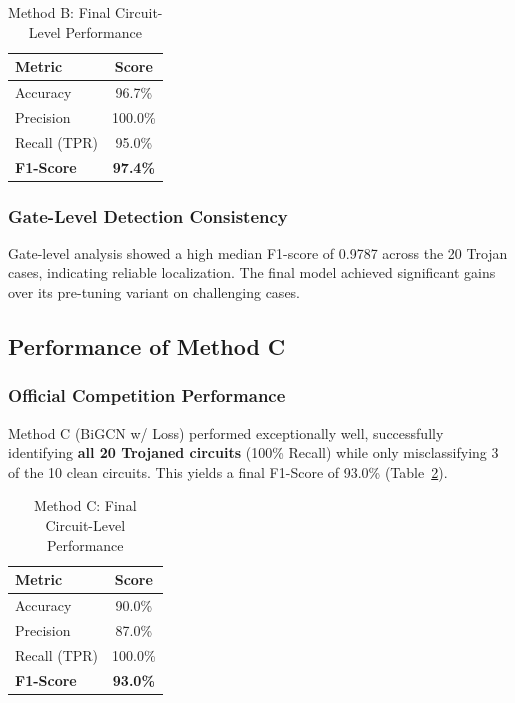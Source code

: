 \documentclass[conference]{IEEEtran}
\begin{document}
\begin{table}[h!]
    \centering
    \caption{Method B: Final Circuit-Level Performance}
    \label{tab:competition_results_B}
    \begin{tabular}{lc}
        \toprule
        \textbf{Metric} & \textbf{Score} \\ \midrule
        Accuracy      & 96.7\% \\
        Precision     & 100.0\% \\
        Recall (TPR)  & 95.0\% \\
        \textbf{F1-Score}      & \textbf{97.4\%} \\ \bottomrule
    \end{tabular}
\end{table}
\subsubsection{Gate-Level Detection Consistency}
Gate-level analysis showed a high median F1-score of 0.9787 across the 20 Trojan cases, indicating reliable localization. The final model achieved significant gains over its pre-tuning variant on challenging cases.

\subsection{Performance of Method C}
\subsubsection{Official Competition Performance}
Method C (BiGCN w/ Loss) performed exceptionally well, successfully identifying \textbf{all 20 Trojaned circuits} (100\% Recall) while only misclassifying 3 of the 10 clean circuits. This yields a final F1-Score of 93.0\% (Table~\ref{tab:competition_results_C}).

\begin{table}[h!]
    \centering
    \caption{Method C: Final Circuit-Level Performance}
    \label{tab:competition_results_C}
    \begin{tabular}{lc}
        \toprule
        \textbf{Metric} & \textbf{Score} \\ \midrule
        Accuracy      & 90.0\% \\
        Precision     & 87.0\% \\
        Recall (TPR)  & 100.0\% \\
        \textbf{F1-Score}      & \textbf{93.0\%} \\ \bottomrule
    \end{tabular}
\end{table}
\end{document}
